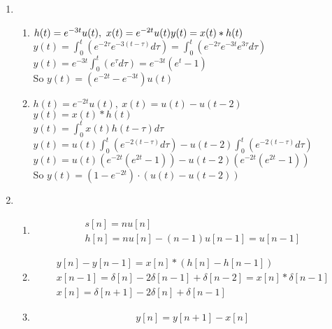 \documentclass[10pt,a4paper, margin=1in]{article}
\begin{document}
\begin{enumerate}
\begin{enumerate}
    
    \end{enumerate}

\item %
    \begin{enumerate}
    \item %
    \(h(t) = e^{-3t}u(t) ,\ x(t) = e^{-2t}u(t) \\ y(t) = x(t) \ast h(t) \) \\
    \(y(t) =  \int_{0}^{t} (e^{-2\tau} e^{-3(t-\tau)} d\tau) = \int_{0}^{t} (e^{-2\tau} e^{-3t} e^{3\tau} d\tau) \) \\
    \(y(t) = e^{-3t}\int_{0}^{t}(e^\tau d\tau)=e^{-3t}(e^{t}-1) \)\\
    So \(y(t)=(e^{-2t}-e^{-3t})u(t)\)
    \item %
    \(h(t) = e^{-2t}u(t), \ x(t) = u(t) - u(t-2)\)\\
    \(y(t) = x(t) \ast h(t) \)\\
    \(y(t) = \int_{0}^{t}x(t)h(t-\tau)d\tau\)\\
    \(y(t) = u(t)\int_{0}^{t}(e^{-2(t-\tau)} d\tau)-
    u(t-2)\int_{0}^{t}(e^{-2(t-\tau)} d\tau)\)\\
    \(y(t) = u(t)(e^{-2t}(e^{2t}-1))-u(t-2)(e^{-2t}(e^{2t}-1))\)\\
    So \(y(t) = (1-e^{-2t})\cdot (u(t)-u(t-2))\)
    \end{enumerate}

\item %
    \begin{enumerate}
    \item %
    \begin{align}
        s[n] = nu[n] \\
        h[n] = nu[n]-(n-1)u[n-1] = u[n-1]
    \end{align}

    \item %
    \begin{align}
        y[n] - y[n-1] = x[n] \ast (h[n] - h[n-1]) \\
        x[n-1] = \delta[n] - 2\delta[n-1] + \delta[n-2] = x[n] \ast \delta[n-1] \\
        x[n] = \delta[n+1] - 2\delta[n] + \delta[n-1]
    \end{align}
    
    \item %
    \begin{align}
        y[n] = y[n+1] - x[n]
    \end{align}
    

\end{enumerate}
\end{enumerate}
\end{document}
